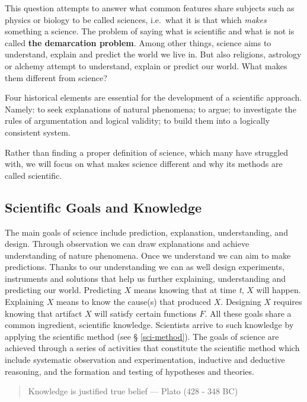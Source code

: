 \documentclass[
]{book}
\begin{document}
This question attempts to answer what common features share subjects such as physics or biology to be called sciences, i.e.~what it is that which \emph{makes} something a science. The problem of saying what is scientific and what is not is called \textbf{the demarcation problem}. Among other things, science aims to understand, explain and predict the world we live in. But also religions, astrology or alchemy attempt to understand, explain or predict our world. What makes them different from science?

Four historical elements are essential for the development of a scientific approach. Namely: to seek explanations of natural phenomena; to argue; to investigate the rules of argumentation and logical validity; to build them into a logically consistent system. \citep{johansson2016philosophy}

Rather than finding a proper definition of science, which many have struggled with, we will focus on what makes science different and why its methods are called scientific.

\hypertarget{scientific-goals-and-knowledge}{%
\subsection{Scientific Goals and Knowledge}\label{scientific-goals-and-knowledge}}

The main goals of science include prediction, explanation, understanding, and design. Through observation we can draw explanations and achieve understanding of nature phenomena. Once we understand we can aim to make predictions. Thanks to our understanding we can as well design experiments, instruments and solutions that help us further explaining, understanding and predicting our world. Predicting \(X\) means knowing that at time \emph{t}, \(X\) will happen. Explaining \(X\) means to know the cause(s) that produced \(X\). Designing \(X\) requires knowing that artifact \(X\) will satisfy certain functions \(F\). All these goals share a common ingredient, scientific knowledge. Scientists arrive to such knowledge by applying the scientific method (see § \ref{sci-method}). The goals of science are achieved through a series of activities that constitute the scientific method which include systematic observation and experimentation, inductive and deductive reasoning, and the formation and testing of hypotheses and theories.

\begin{quote}
Knowledge is justified true belief --- Plato (428 - 348 BC)
\end{quote}
\end{document}
